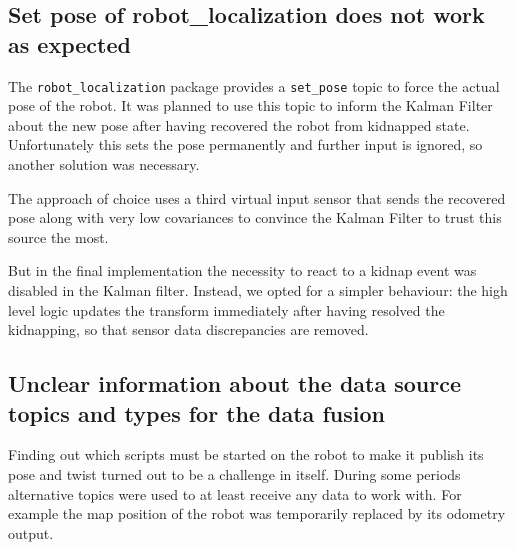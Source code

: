\subsection{Set pose of robot\_localization does not work as expected}
The \texttt{robot\_localization} package provides a \texttt{set\_pose} topic to force the actual pose of the robot. It was planned to use this topic to inform the Kalman Filter about the new pose after having recovered the robot from kidnapped state. Unfortunately this sets the pose permanently and further input is ignored, so another solution was necessary.

The approach of choice uses a third virtual input sensor that sends the recovered pose along with very low covariances to convince the Kalman Filter to trust this source the most.

But in the final implementation the necessity to react to a kidnap event was disabled in the Kalman filter. Instead, we opted for a simpler behaviour: the high level logic updates the transform immediately after having resolved the kidnapping, so that sensor data discrepancies are removed. 

\subsection{Unclear information about the data source topics and types for the data fusion}
Finding out which scripts must be started on the robot to make it publish its pose and twist turned out to be a challenge in itself. During some periods alternative topics were used to at least receive any data to work with. For example the map position of the robot was temporarily replaced by its odometry output.